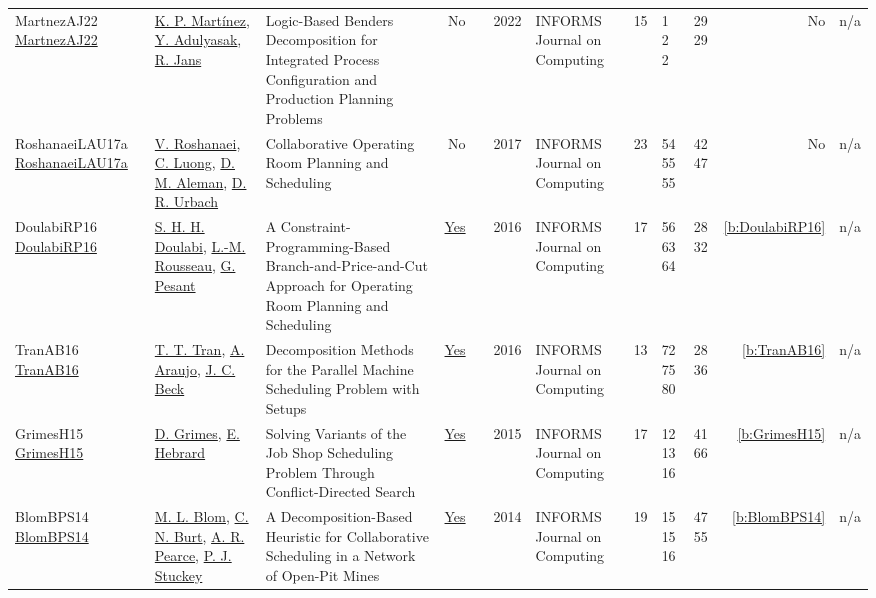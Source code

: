 {\begin{longtable}{>{\raggedright\arraybackslash}p{3cm}>{\raggedright\arraybackslash}p{4.5cm}>{\raggedright\arraybackslash}p{6.0cm}rrrp{2.5cm}rp{1cm}p{1cm}rr}
MartnezAJ22 \href{http://dx.doi.org/10.1287/ijoc.2021.1079}{MartnezAJ22} & \hyperref[auth:a936]{K. P. Martínez}, \hyperref[auth:a937]{Y. Adulyasak}, \hyperref[auth:a841]{R. Jans} & Logic-Based Benders Decomposition for Integrated Process Configuration and Production Planning Problems & No & \cite{MartnezAJ22} & 2022 & \cellcolor{red!20}INFORMS Journal on Computing & 15 & 1 2 2 & 29 29 & No & n/a\\
RoshanaeiLAU17a \href{http://dx.doi.org/10.1287/ijoc.2017.0745}{RoshanaeiLAU17a} & \hyperref[auth:a728]{V. Roshanaei}, \hyperref[auth:a927]{C. Luong}, \hyperref[auth:a895]{D. M. Aleman}, \hyperref[auth:a896]{D. R. Urbach} & Collaborative Operating Room Planning and Scheduling & No & \cite{RoshanaeiLAU17a} & 2017 & \cellcolor{red!20}INFORMS Journal on Computing & 23 & 54 55 55 & 42 47 & No & n/a\\
DoulabiRP16 \href{https://doi.org/10.1287/ijoc.2015.0686}{DoulabiRP16} & \hyperref[auth:a330]{S. H. H. Doulabi}, \hyperref[auth:a326]{L.-M. Rousseau}, \hyperref[auth:a8]{G. Pesant} & A Constraint-Programming-Based Branch-and-Price-and-Cut Approach for Operating Room Planning and Scheduling & \href{../works/DoulabiRP16.pdf}{Yes} & \cite{DoulabiRP16} & 2016 & \cellcolor{red!20}INFORMS Journal on Computing & 17 & 56 63 64 & 28 32 & \ref{b:DoulabiRP16} & n/a\\
TranAB16 \href{https://doi.org/10.1287/ijoc.2015.0666}{TranAB16} & \hyperref[auth:a799]{T. T. Tran}, \hyperref[auth:a807]{A. Araujo}, \hyperref[auth:a89]{J. C. Beck} & Decomposition Methods for the Parallel Machine Scheduling Problem with Setups & \href{../works/TranAB16.pdf}{Yes} & \cite{TranAB16} & 2016 & \cellcolor{red!20}INFORMS Journal on Computing & 13 & 72 75 80 & 28 36 & \ref{b:TranAB16} & n/a\\
GrimesH15 \href{https://doi.org/10.1287/ijoc.2014.0625}{GrimesH15} & \hyperref[auth:a181]{D. Grimes}, \hyperref[auth:a1]{E. Hebrard} & \cellcolor{green!10}Solving Variants of the Job Shop Scheduling Problem Through Conflict-Directed Search & \href{../works/GrimesH15.pdf}{Yes} & \cite{GrimesH15} & 2015 & \cellcolor{red!20}INFORMS Journal on Computing & 17 & 12 13 16 & 41 66 & \ref{b:GrimesH15} & n/a\\
BlomBPS14 \href{https://doi.org/10.1287/ijoc.2013.0590}{BlomBPS14} & \hyperref[auth:a795]{M. L. Blom}, \hyperref[auth:a322]{C. N. Burt}, \hyperref[auth:a324]{A. R. Pearce}, \hyperref[auth:a125]{P. J. Stuckey} & A Decomposition-Based Heuristic for Collaborative Scheduling in a Network of Open-Pit Mines & \href{../works/BlomBPS14.pdf}{Yes} & \cite{BlomBPS14} & 2014 & \cellcolor{red!20}INFORMS Journal on Computing & 19 & 15 15 16 & 47 55 & \ref{b:BlomBPS14} & n/a\\

\end{longtable}}
